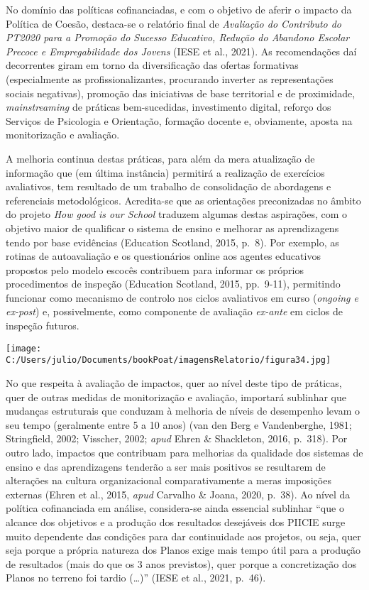 \documentclass[
]{book}
\begin{document}
No domínio das políticas cofinanciadas, e com o objetivo de aferir o impacto da Política de Coesão, destaca-se o relatório final de \emph{Avaliação do Contributo do PT2020 para a Promoção do Sucesso Educativo, Redução do Abandono Escolar Precoce e Empregabilidade dos Jovens} (IESE et al., 2021). As recomendações daí decorrentes giram em torno da diversificação das ofertas formativas (especialmente as profissionalizantes, procurando inverter as representações sociais negativas), promoção das iniciativas de base territorial e de proximidade, \emph{mainstreaming} de práticas bem-sucedidas, investimento digital, reforço dos Serviços de Psicologia e Orientação, formação docente e, obviamente, aposta na monitorização e avaliação.

A melhoria continua destas práticas, para além da mera atualização de informação que (em última instância) permitirá a realização de exercícios avaliativos, tem resultado de um trabalho de consolidação de abordagens e referenciais metodológicos. Acredita-se que as orientações preconizadas no âmbito do projeto \emph{How good is our School} traduzem algumas destas aspirações, com o objetivo maior de qualificar o sistema de ensino e melhorar as aprendizagens tendo por base evidências (Education Scotland, 2015, p.~8). Por exemplo, as rotinas de autoavaliação e os questionários online aos agentes educativos propostos pelo modelo escocês contribuem para informar os próprios procedimentos de inspeção (Education Scotland, 2015, pp.~9-11), permitindo funcionar como mecanismo de controlo nos ciclos avaliativos em curso (\emph{ongoing e ex-post}) e, possivelmente, como componente de avaliação \emph{ex-ante} em ciclos de inspeção futuros.

\texttt{[image: C:/Users/julio/Documents/bookPoat/imagensRelatorio/figura34.jpg]}

No que respeita à avaliação de impactos, quer ao nível deste tipo de práticas, quer de outras medidas de monitorização e avaliação, importará sublinhar que mudanças estruturais que conduzam à melhoria de níveis de desempenho levam o seu tempo (geralmente entre 5 a 10 anos) (van den Berg e Vandenberghe, 1981; Stringfield, 2002; Visscher, 2002; \emph{apud} Ehren \& Shackleton, 2016, p.~318). Por outro lado, impactos que contribuam para melhorias da qualidade dos sistemas de ensino e das aprendizagens tenderão a ser mais positivos se resultarem de alterações na cultura organizacional comparativamente a meras imposições externas (Ehren et al., 2015, \emph{apud} Carvalho \& Joana, 2020, p.~38). Ao nível da política cofinanciada em análise, considera-se ainda essencial sublinhar ``que o alcance dos objetivos e a produção dos resultados desejáveis dos PIICIE surge muito dependente das condições para dar continuidade aos projetos, ou seja, quer seja porque a própria natureza dos Planos exige mais tempo útil para a produção de resultados (mais do que os 3 anos previstos), quer porque a concretização dos Planos no terreno foi tardio (\ldots)'' (IESE et al., 2021, p.~46).
\end{document}
